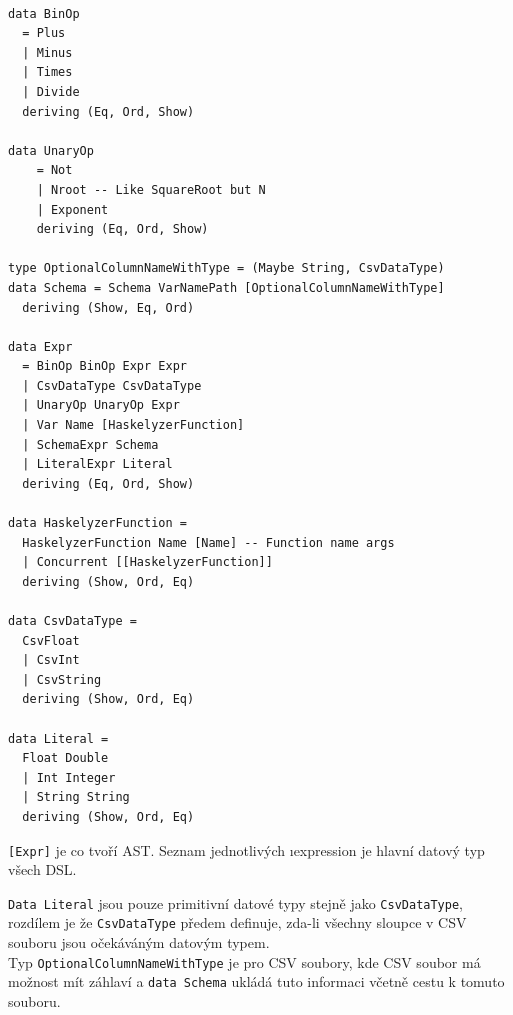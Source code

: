 \documentclass[male,czech]{kithesis}
\newcommand{\haskellInline}[1]{\colorbox{gray!10}{\texttt{#1}}}
\begin{document}
\begin{verbatim}

data BinOp
  = Plus
  | Minus
  | Times
  | Divide
  deriving (Eq, Ord, Show)

data UnaryOp
    = Not
    | Nroot -- Like SquareRoot but N 
    | Exponent
    deriving (Eq, Ord, Show)

type OptionalColumnNameWithType = (Maybe String, CsvDataType)
data Schema = Schema VarNamePath [OptionalColumnNameWithType] 
  deriving (Show, Eq, Ord)

data Expr
  = BinOp BinOp Expr Expr
  | CsvDataType CsvDataType 
  | UnaryOp UnaryOp Expr 
  | Var Name [HaskelyzerFunction]
  | SchemaExpr Schema 
  | LiteralExpr Literal
  deriving (Eq, Ord, Show)

data HaskelyzerFunction = 
  HaskelyzerFunction Name [Name] -- Function name args
  | Concurrent [[HaskelyzerFunction]]
  deriving (Show, Ord, Eq)

data CsvDataType = 
  CsvFloat 
  | CsvInt 
  | CsvString 
  deriving (Show, Ord, Eq)

data Literal = 
  Float Double 
  | Int Integer
  | String String
  deriving (Show, Ord, Eq)

\end{verbatim}

{
\begin{center}
\end{center}
}

\haskellInline{[Expr]} je co tvoří AST.
Seznam jednotlivých \i{expression} je hlavní datový typ všech DSL. 

\haskellInline{Data Literal} jsou pouze primitivní datové typy stejně jako
\haskellInline{CsvDataType}, 
rozdílem je že \haskellInline{CsvDataType} předem definuje, 
zda-li všechny sloupce v CSV souboru jsou očekáváným datovým typem. \\
Typ \haskellInline{OptionalColumnNameWithType} je pro CSV soubory, 
kde CSV soubor má možnost
mít záhlaví a \haskellInline{data Schema} ukládá tuto informaci včetně cestu k tomuto souboru. 
\end{document}
